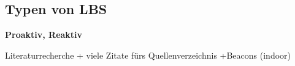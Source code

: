 \subsection{Typen von LBS}

\textbf{Proaktiv, Reaktiv}

Literaturrecherche + viele Zitate fürs Quellenverzeichnis +Beacons (indoor)